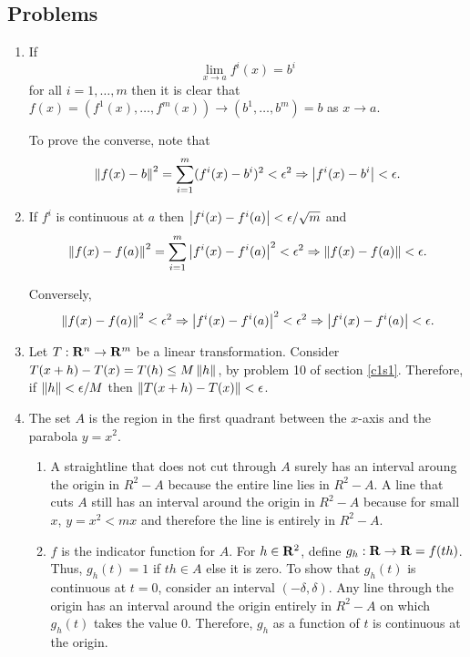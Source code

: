 \subsection{Problems}
\begin{enumerate}
\item If 
\[
\lim_{x \rightarrow a} f^i(x) = b^i
\]
for all $i = 1, \ldots, m$ then it is clear that $f(x) = (f^1(x), \ldots,
f^m(x)) \rightarrow (b^1, \ldots, b^m) = b$ as $x \rightarrow a$.

To prove the converse, note that 
\[
\left\Vert{f(x) - b}\right\Vert^2 = \sum_{i=1}^m (f^i(x) - b^i)^2 < \epsilon^2 \Rightarrow
\left\vert{f^i(x) - b^i}\right\vert < \epsilon.
\]

\item If $f^i$ is continuous at $a$ then $\left\vert{f^i(x) - f^i(a)}\right\vert < \epsilon/
\sqrt{m}$ and
\[
\left\Vert{f(x) - f(a)}\right\Vert^2 = \sum_{i=1}^m \left\vert{f^i(x) - f^i(a)}\right\vert^2 < \epsilon^2
\Rightarrow \left\Vert{f(x) - f(a)}\right\Vert < \epsilon.
\]

Conversely, 
\[
\left\Vert{f(x) - f(a)}\right\Vert^2 < \epsilon^2 \Rightarrow \left\vert{f^i(x) - f^i(a)}\right\vert
^2 < \epsilon^2 \Rightarrow \left\vert{f^i(x) - f^i(a)}\right\vert < \epsilon.
\]

\item Let $T: \mathbf{R}^n \rightarrow \mathbf{R}^m$ be a linear transformation. Consider
$T(x + h) - T(x) = T(h) \le M\left\Vert{h}\right\Vert$, by problem 10 of section \ref{c1s1}.
Therefore, if $\left\Vert{h}\right\Vert < \epsilon/M$ then $\left\Vert{T(x + h) - T(x)}\right\Vert < \epsilon$.

\item The set $A$ is the region in the first quadrant between the $x$-axis and
the parabola $y = x^2$.
\begin{enumerate}
\item A straightline that does not cut through $A$ surely has an interval
aroung the origin in $R^2 - A$ because the entire line lies in $R^2 - A$. A 
line that cuts $A$ still has an interval around the origin in $R^2 - A$
because for small $x$, $y = x^2 < mx$ and therefore the line is entirely in $R^2
- A$.

\item $f$ is the indicator function for $A$. For $h \in \mathbf{R}^2$, define 
$g_h: \mathbf{R} \rightarrow \mathbf{R} = f(th)$. Thus, $g_h(t) = 1$ if $th \in A$ else it
is zero. To show that $g_h(t)$ is continuous at $t = 0$, consider an interval
$(-\delta, \delta)$. Any line through the origin has an interval around the 
origin entirely in $R^2 - A$ on which $g_h(t)$ takes the value $0$. Therefore,
$g_h$ as a function of $t$ is continuous at the origin.


\end{enumerate}
\end{enumerate}
